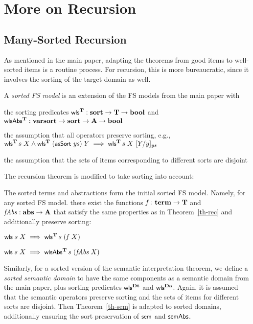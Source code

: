 \section{More on Recursion} \label{app-moreInd}



\subsection{Many-Sorted Recursion}\label{app-RecDef}

As mentioned in the main paper, adapting the theorems from 
good items to well-sorted items is a routine process. 
For recursion, this is more bureaucratic, since it involves 
the sorting of the target domain as well.


A {\em sorted FS model} is an extension 
of the %
FS models from the main paper with
\begin{myitem}
\item the sorting predicates $\mbox{\rm\textsf{\small wls}}^{\bf T} : \mbox{\bf sort} \rightarrow \bf T \rightarrow \mbox{\bf bool}$ and 
$\mbox{\rm\textsf{\small wlsAbs}}^{\bf T} : \mbox{\bf varsort} \rightarrow \mbox{\bf sort} \rightarrow \bf A \rightarrow \mbox{\bf bool}$
\item the assumption that all operators preserve sorting, 
e.g., 
\\$\mbox{\rm\textsf{\small wls}}^{\bf T}\,s\;X \wedge \mbox{\rm\textsf{\small wls}}^{\bf T}\;(\mbox{\rm\textsf{\small asSort}}\;\mbox{\textit{ys}})\;Y 
\;\Longrightarrow\;
\mbox{\rm\textsf{\small wls}}^{\bf T}\,s\;X\ [Y / y]_{ys}$
\item the assumption that the sets of items corresponding to different 
sorts are disjoint
\end{myitem}

The recursion theorem is modified to take sorting into account: 

\begin{thm}\label{th-rec-sort} \rm
The sorted terms and abstractions form the initial sorted FS model. Namely, 
for any sorted FS model. %
there exist the functions $\mbox{\textit{f}}:\mbox{\bf term} \rightarrow \bf T$ 
and $\mbox{\textit{fAbs}} : \mbox{\bf abs} \rightarrow \bf A$ that satisfy the same properties as in Theorem~\ref{th-rec} 
and additionally preserve sorting:
\begin{myitem}
\item $\mbox{\rm\textsf{\small wls}}\;s\;X \;\Longrightarrow\; \mbox{\rm\textsf{\small wls}}^{\bf T}\,s\;(\mbox{\textit{f}}\;X)$
\item $\mbox{\rm\textsf{\small wls}}\;s\;X \;\Longrightarrow\; \mbox{\rm\textsf{\small wlsAbs}}^{\bf T}\,s\;(\mbox{\textit{fAbs}}\;X)$
\end{myitem}
\end{thm}


Similarly, for a sorted version of the semantic interpretation theorem, we define 
a {\em sorted semantic domain} to have the same components as a semantic domain 
from the main paper, plus sorting predicates $\mbox{\rm\textsf{\small wls}}^{\bf Dt}$ and $\mbox{\rm\textsf{\small wls}}^{\bf Da}$.  
Again, it is assumed that the semantic operators preserve sorting and the 
sets of items for different sorts are disjoint.
Then Theorem~\ref{th-sem} is adapted to sorted domains, additionally ensuring 
the sort preservation of $\mbox{\rm\textsf{\small sem}}$ and $\mbox{\rm\textsf{\small semAbs}}$. 


